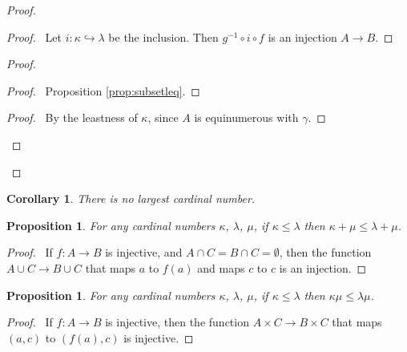 \documentclass{book}
\let\qed\relax
\newtheorem{prop}[ax]{Proposition}
\newtheorem{cor}{Corollary}[ax]
\theoremstyle{definition}
\begin{document}
\begin{proof}
\pf
{}
\begin{proof}
	\pf\ Let $i : \kappa \hookrightarrow \lambda$ be the inclusion. Then $g^{-1} \circ i \circ f$ is an injection $A \rightarrow B$.
\end{proof}
\begin{proof}
	\begin{proof}
		\pf\ Proposition \ref{prop:subsetleq}.
	\end{proof}
	\begin{proof}
		\pf\ By the leastness of $\kappa$, since $A$ is equinumerous with $\gamma$.
	\end{proof}
\end{proof}
\qed
\end{proof}

\begin{cor}
There is no largest cardinal number.
\end{cor}

\begin{prop}
For any cardinal numbers $\kappa$, $\lambda$, $\mu$, if $\kappa \leq \lambda$ then $\kappa + \mu \leq \lambda + \mu$.
\end{prop}

\begin{proof}
\pf\ If $f : A \rightarrow B$ is injective, and $A \cap C = B \cap C = \emptyset$, then the function $A \cup C \rightarrow B \cup C$ that maps $a$ to $f(a)$ and maps $c$ to $c$ is an injection. \qed
\end{proof}

\begin{prop}
For any cardinal numbers $\kappa$, $\lambda$, $\mu$, if $\kappa \leq \lambda$ then $\kappa \mu \leq \lambda \mu$.
\end{prop}

\begin{proof}
\pf\ If $f : A \rightarrow B$ is injective, then the function $A \times C \rightarrow B \times C$ that maps $(a,c)$ to $(f(a),c)$ is injective. \qed
\end{proof}
\end{document}
